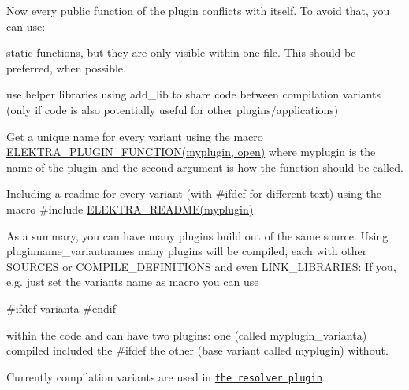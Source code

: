 Now every public function of the plugin conflicts with itself. To avoid that, you can use\+:


\begin{DoxyItemize}
\item static functions, but they are only visible within one file. This should be preferred, when possible.
\item use helper libraries using {\ttfamily add\+\_\+lib} to share code between compilation variants (only if code is also potentially useful for other plugins/applications)
\item Get a unique name for every variant using the macro {\ttfamily \hyperlink{group__plugin_gacb05c902e4014535589db4193da87460}{E\+L\+E\+K\+T\+R\+A\+\_\+\+P\+L\+U\+G\+I\+N\+\_\+\+F\+U\+N\+C\+T\+I\+O\+N(myplugin, open)}} where myplugin is the name of the plugin and the second argument is how the function should be called.
\item Including a readme for every variant (with {\ttfamily \#ifdef} for different text) using the macro {\ttfamily \#include \hyperlink{group__plugin_gabdcb97b05a83130c32bbde75db80fc50}{E\+L\+E\+K\+T\+R\+A\+\_\+\+R\+E\+A\+D\+M\+E(myplugin)}}
\end{DoxyItemize}

As a summary, you can have many plugins build out of the same source. Using {\ttfamily pluginname\+\_\+variantnames} many plugins will be compiled, each with other {\ttfamily S\+O\+U\+R\+C\+ES} or {\ttfamily C\+O\+M\+P\+I\+L\+E\+\_\+\+D\+E\+F\+I\+N\+I\+T\+I\+O\+NS} and even {\ttfamily L\+I\+N\+K\+\_\+\+L\+I\+B\+R\+A\+R\+I\+ES}\+: If you, e.\+g. just set the variants name as macro you can use


\begin{DoxyCode}
\textcolor{preprocessor}{#ifdef varianta}
\textcolor{preprocessor}{#endif}
\end{DoxyCode}


within the code and can have two plugins\+: one (called {\ttfamily myplugin\+\_\+varianta}) compiled included the {\ttfamily \#ifdef} the other (base variant called {\ttfamily myplugin}) without.

Currently compilation variants are used in \href{https://master.libelektra.org/src/plugins/resolver/resolver.c}{\tt the resolver plugin}. 